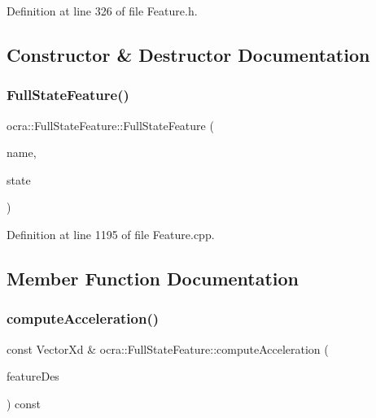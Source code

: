 Definition at line 326 of file Feature.\+h.



\subsection{Constructor \& Destructor Documentation}
\hypertarget{classocra_1_1FullStateFeature_a58460a5615fefc0b12b5a04767ea2386}{}\label{classocra_1_1FullStateFeature_a58460a5615fefc0b12b5a04767ea2386} 
\subsubsection{\texorpdfstring{Full\+State\+Feature()}{FullStateFeature()}}
{\footnotesize\ttfamily ocra\+::\+Full\+State\+Feature\+::\+Full\+State\+Feature (\begin{DoxyParamCaption}\item[{const std\+::string \&}]{name,  }\item[{Full\+State\+::\+Ptr}]{state }\end{DoxyParamCaption})}



Definition at line 1195 of file Feature.\+cpp.



\subsection{Member Function Documentation}
\hypertarget{classocra_1_1FullStateFeature_a1ca39e66ea07182b46ba7e60477efb17}{}\label{classocra_1_1FullStateFeature_a1ca39e66ea07182b46ba7e60477efb17} 
\subsubsection{\texorpdfstring{compute\+Acceleration()}{computeAcceleration()}\hspace{0.1cm}{\footnotesize\ttfamily [1/2]}}
{\footnotesize\ttfamily const Vector\+Xd \& ocra\+::\+Full\+State\+Feature\+::compute\+Acceleration (\begin{DoxyParamCaption}\item[{const \hyperlink{classocra_1_1Feature}{Feature} \&}]{feature\+Des }\end{DoxyParamCaption}) const\hspace{0.3cm}{\ttfamily [virtual]}}



